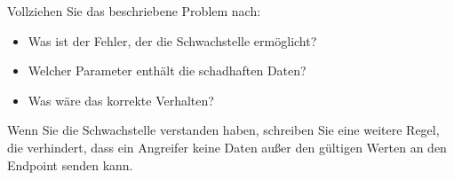 Vollziehen Sie das beschriebene Problem nach:
\begin{itemize}
    \item Was ist der Fehler, der die Schwachstelle ermöglicht?
    \item Welcher Parameter enthält die schadhaften Daten?
    \item Was wäre das korrekte Verhalten?
\end{itemize}

Wenn Sie die Schwachstelle verstanden haben, schreiben Sie eine weitere Regel, die verhindert, dass ein Angreifer keine Daten außer den gültigen Werten an den Endpoint senden kann.

\pagebreak